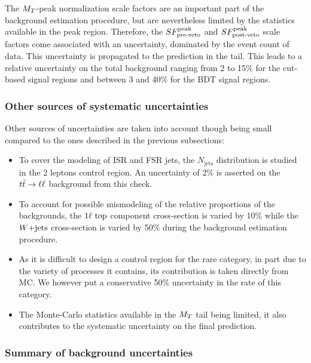     The $M_T$-peak normalization scale factors are an important part of the
    background estimation procedure, but are nevertheless limited by the
    statistics available in the peak region. Therefore, the $SF_{\text{pre-veto}}^{\text{peak}}$ and
    $SF_{\text{post-veto}}^{\text{peak}}$ scale factors come associated with an uncertainty, dominated by
    the event count of data. This uncertainty is propagated to the prediction in
    the tail. This leads to a relative uncertainty on the total background
    ranging from 2 to 15\% for the cut-based signal regions and between 3 and
    40\% for the BDT signal regions.

    \subsubsection{Other sources of systematic uncertainties}

    Other sources of uncertainties are taken into account though being small
    compared to the ones described in the previous subsections:
    \begin{itemize}
        \item To cover the modeling of ISR and FSR jets, the $N_\text{jets}$
            distribution is studied in the 2 leptons control region. An
            uncertainty of 2\% is asserted on the $t\bar{t} \rightarrow \ell \ell$ background from
            this check.
        \item To account for possible mismodeling of the relative proportions of
            the backgrounds, the $1\ell~\text{top}$ component cross-section is
            varied by 10\% while the $\text{$W$+jets}$ cross-section is varied by 50\%
            during the background estimation procedure.
        \item As it is difficult to design a control region for the rare
            category, in part due to the variety of processes it contains, its
            contribution is taken directly from MC. We however put a
            conservative 50\% uncertainty in the rate of this category.
        \item The Monte-Carlo statistics available in the $M_T$ tail being
            limited, it also contributes to the systematic uncertainty on the
            final prediction.
    \end{itemize}

    \subsubsection{Summary of background uncertainties}

